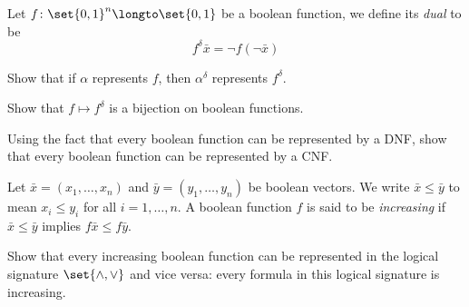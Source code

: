     Let $f\colon\set{0,1}^n\longto\set{0,1}$ be a boolean function, we define its {\it dual} to be
    $$ f^\delta\bar x = \neg f(\neg\bar x) $$

    \benum
        \item Show that if $\alpha$ represents $f$, then $\alpha^\delta$ represents $f^\delta$.
        \item Show that $f\mapsto f^\delta$ is a bijection on boolean functions.
        \item Using the fact that every boolean function can be represented by a DNF, show that
        every boolean function can be represented by a CNF.
    \eenum

\eprob

\bprob

    Let $\bar x=(x_1,\dots,x_n)$ and $\bar y=(y_1,\dots,y_n)$ be boolean vectors.
    We write $\bar x\leq\bar y$ to mean $x_i\leq y_i$ for all $i=1,\dots,n$.
    A boolean function $f$ is said to be {\it increasing} if $\bar x\leq\bar y$ implies
    $f\bar x\leq f\bar y$.

    Show that every increasing boolean function can be represented in the logical signature
    $\set{{\land},{\lor}}$ and vice versa: every formula in this logical signature is increasing.

\eprob

\bye

